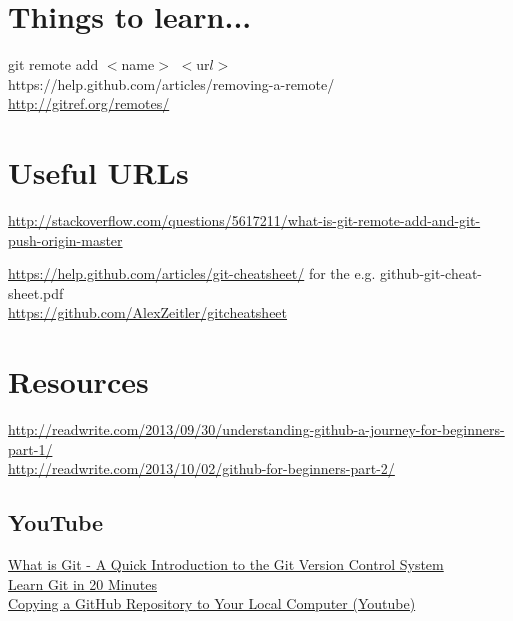 \documentclass[11pt,a4paper]{article}
\begin{document}
\section{Things to learn...}
git remote add $<$name$>$ $<$ur$l>$\\

\noindent
https://help.github.com/articles/removing-a-remote/ \\

\noindent
\href{http://gitref.org/remotes/}{http://gitref.org/remotes/}\\




\section{Useful URLs}
\noindent
\href{http://stackoverflow.com/questions/5617211/what-is-git-remote-add-and-git-push-origin-master}{http://stackoverflow.com/questions/5617211/what-is-git-remote-add-and-git-push-origin-master}

\noindent
\href{https://help.github.com/articles/git-cheatsheet}{https://help.github.com/articles/git-cheatsheet/}
for the e.g. github-git-cheat-sheet.pdf \\

\noindent
\href{https://github.com/AlexZeitler/gitcheatsheet}{https://github.com/AlexZeitler/gitcheatsheet}






\section*{Resources}

\noindent
\href{http://readwrite.com/2013/09/30/understanding-github-a-journey-for-beginners-part-1/}{http://readwrite.com/2013/09/30/understanding-github-a-journey-for-beginners-part-1/}\\

\noindent
\href{http://readwrite.com/2013/10/02/github-for-beginners-part-2/}{http://readwrite.com/2013/10/02/github-for-beginners-part-2/}\\


    \subsection*{YouTube}
    \noindent
    \href{https://www.youtube.com/watch?v=OqmSzXDrJBk}{What is Git - A Quick Introduction to the Git Version Control System}\\
    
    \noindent
    \href{https://www.youtube.com/watch?v=Y9XZQO1n_7c}{Learn Git in 20 Minutes}\\
    
    \noindent
    \href{https://www.youtube.com/watch?v=O72FWNeO-xY}{Copying a GitHub Repository to Your Local Computer (Youtube)}\\
    
\end{document}
